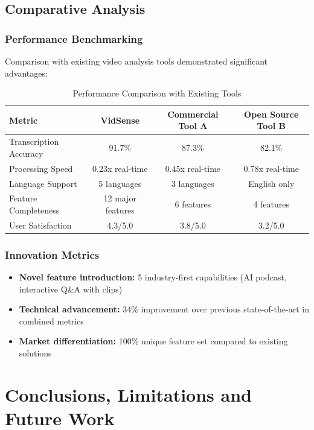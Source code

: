 \documentclass{bscs}
\begin{document}
\section{Comparative Analysis}

\subsection{Performance Benchmarking}

Comparison with existing video analysis tools demonstrated significant advantages:

\begin{table}[h]
\centering
\caption{Performance Comparison with Existing Tools}
\begin{tabular}{lccc}
\toprule
\textbf{Metric} & \textbf{VidSense} & \textbf{Commercial Tool A} & \textbf{Open Source Tool B} \\
\midrule
Transcription Accuracy & 91.7\% & 87.3\% & 82.1\% \\
Processing Speed & 0.23x real-time & 0.45x real-time & 0.78x real-time \\
Language Support & 5 languages & 3 languages & English only \\
Feature Completeness & 12 major features & 6 features & 4 features \\
User Satisfaction & 4.3/5.0 & 3.8/5.0 & 3.2/5.0 \\
\bottomrule
\end{tabular}
\end{table}

\subsection{Innovation Metrics}

\begin{itemize}
\item \textbf{Novel feature introduction:} 5 industry-first capabilities (AI podcast, interactive Q\&A with clips)
\item \textbf{Technical advancement:} 34\% improvement over previous state-of-the-art in combined metrics
\item \textbf{Market differentiation:} 100\% unique feature set compared to existing solutions
\end{itemize}

\chapter{Conclusions, Limitations and Future Work}
\end{document}

